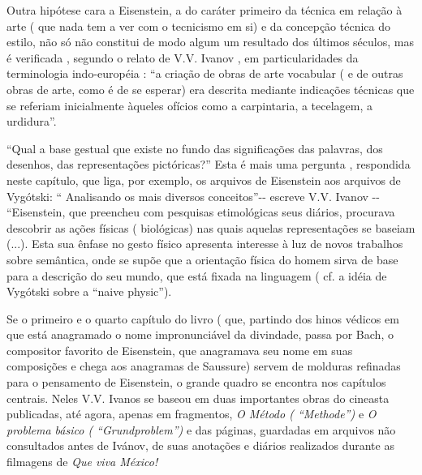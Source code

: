Outra hipótese cara a Eisenstein, a do caráter primeiro da técnica em
relação à arte ( que nada tem a ver com o tecnicismo em si) e da
concepção técnica do estilo, não só não constitui de modo algum um
resultado dos últimos séculos, mas é verificada , segundo o relato de
V.V. Ivanov , em particularidades da terminologia indo-européia : ``a
criação de obras de arte vocabular ( e de outras obras de arte, como é
de se esperar) era descrita mediante indicações técnicas que se referiam
inicialmente àqueles ofícios como a carpintaria, a tecelagem, a
urdidura''.

``Qual a base gestual que existe no fundo das significações das
palavras, dos desenhos, das representações pictóricas?'' Esta é mais uma
pergunta , respondida neste capítulo, que liga, por exemplo, os arquivos
de Eisenstein aos arquivos de Vygótski: `` Analisando os mais diversos
conceitos''-\/- escreve V.V. Ivanov -\/- ``Eisenstein, que preencheu com
pesquisas etimológicas seus diários, procurava descobrir as ações
físicas ( biológicas) nas quais aquelas representações se baseiam (...).
Esta sua ênfase no gesto físico apresenta interesse à luz de novos
trabalhos sobre semântica, onde se supõe que a orientação física do
homem sirva de base para a descrição do seu mundo, que está fixada na
linguagem ( cf. a idéia de Vygótski sobre a ``naive physic'').

Se o primeiro e o quarto capítulo do livro ( que, partindo dos hinos
védicos em que está anagramado o nome impronunciável da divindade, passa
por Bach, o compositor favorito de Eisenstein, que anagramava seu nome
em suas composições e chega aos anagramas de Saussure) servem de
molduras refinadas para o pensamento de Eisenstein, o grande quadro se
encontra nos capítulos centrais. Neles V.V. Ivanos se baseou em duas
importantes obras do cineasta publicadas, até agora, apenas em
fragmentos, \emph{O Método ( ``Methode'')} e \emph{O problema básico (
``Grundproblem'')} e das páginas, guardadas em arquivos não consultados
antes de Ivánov, de suas anotações e diários realizados durante as
filmagens de \emph{Que viva México!}

